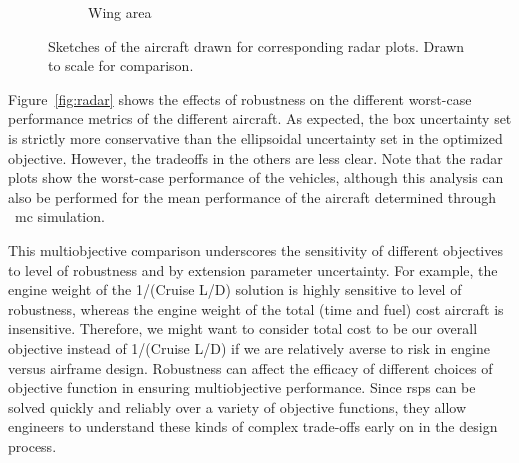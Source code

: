 \begin{figure}
\begin{center}
\begin{subfigure}{0.4\linewidth}
{}
            \caption{Wing area}
        \end{subfigure}
        \caption{Sketches of the aircraft drawn for corresponding radar plots. Drawn to scale for comparison.}
    \end{center}
\end{figure}

Figure~\ref{fig:radar} shows the effects of robustness on
the different worst-case performance metrics of the different aircraft.
As expected, the box uncertainty set is strictly more conservative than the ellipsoidal uncertainty set
in the optimized objective. However, the tradeoffs in the others are less clear.
Note that the radar plots show the worst-case performance of the vehicles, although
this analysis can also be performed for the mean performance
of the aircraft determined through ~\gls{mc} simulation.

This multiobjective comparison underscores the sensitivity of different
objectives to level of robustness and by extension parameter uncertainty.
For example, the engine weight of the 1/(Cruise L/D) solution is highly sensitive to level of robustness,
whereas the engine weight of the total (time and fuel) cost aircraft is insensitive.
Therefore, we might want to consider total cost to be our overall objective instead of 1/(Cruise L/D)
if we are relatively averse to risk in engine versus airframe design.
Robustness can affect the efficacy of different choices of objective function in ensuring multiobjective performance.
Since \gls{rsp}s can be solved quickly and reliably over a variety of objective functions,
they allow engineers to understand these kinds of complex trade-offs early on in the design process.


